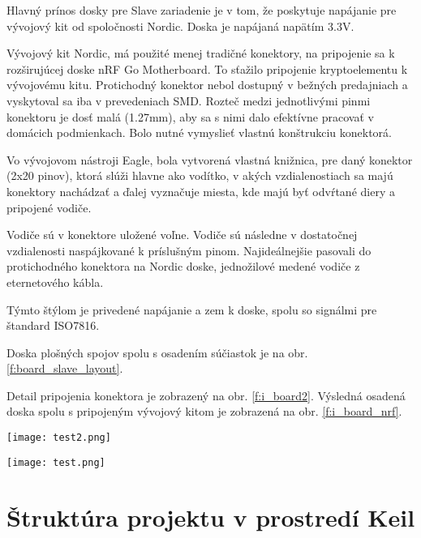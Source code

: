 \documentclass[12pt,a4paper,oneside,openright]{report}
\begin{document}
	Hlavný prínos dosky pre Slave zariadenie je v tom, že poskytuje napájanie pre vývojový kit od spoločnosti Nordic. Doska je napájaná napätím 3.3V.
	
	Vývojový kit Nordic, má použité menej tradičné konektory, na pripojenie sa k rozširujúcej doske nRF Go Motherboard. To sťažilo pripojenie kryptoelementu k vývojovému kitu. Protichodný konektor nebol dostupný v bežných predajniach a vyskytoval sa iba v prevedeniach SMD. 
	Rozteč medzi jednotlivými pinmi konektoru je dosť malá (1.27mm), aby sa s nimi dalo efektívne pracovať v domácich podmienkach. Bolo nutné vymyslieť vlastnú konštrukciu konektorá.	
	
	Vo vývojovom nástroji Eagle, bola vytvorená vlastná knižnica, pre daný konektor (2x20 pinov), ktorá slúži hlavne ako vodítko, v akých vzdialenostiach sa majú konektory nachádzať a ďalej vyznačuje miesta, kde majú byť odvŕtané diery a pripojené vodiče.
	
	Vodiče sú v konektore uložené voľne. Vodiče sú následne v dostatočnej vzdialenosti naspájkované k príslušným pinom. Najideálnejšie pasovali do protichodného konektora na Nordic doske, jednožilové medené vodiče z eternetového kábla.
	
	Týmto štýlom je privedené napájanie a zem k doske, spolu so signálmi pre štandard ISO7816. 
	
	Doska plošných spojov spolu s osadením súčiastok je na obr. \ref{f:board_slave_layout}.
	
	Detail pripojenia konektora je zobrazený na obr. \ref{f:i_board2}.
	Výsledná osadená doska spolu s pripojeným vývojový kitom je zobrazená na obr. \ref{f:i_board_nrf}.
	
	\begin{figure*}[!htb]
		\centering
		\texttt{[image: test2.png]}
		\caption{Schéma zapojenia a pripojenia slave zariadenie s kryptoelementom.}
		\label{f:board_slave_schematic}
	\end{figure*}
	
	\begin{figure*}[!htb]
		\centering
		\texttt{[image: test.png]}
		\caption{Rozloženie súčiastok na doske plošných spojov pre slave zariadenie s kryptoelementom.}
		\label{f:board_slave_layout}
	\end{figure*}

\section{Štruktúra projektu v prostredí Keil}
\end{document}
